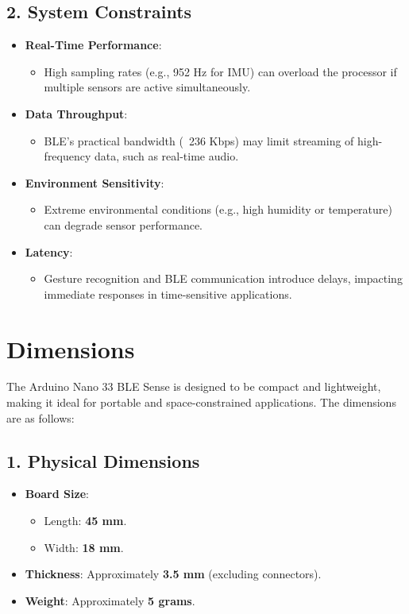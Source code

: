 	\subsection*{2. System Constraints}
	
	\begin{itemize}
		\item \textbf{Real-Time Performance}:
		\begin{itemize}
			\item High sampling rates (e.g., 952 Hz for IMU) can overload the processor if multiple sensors are active simultaneously.
		\end{itemize}
		\item \textbf{Data Throughput}:
		\begin{itemize}
			\item BLE's practical bandwidth (~236 Kbps) may limit streaming of high-frequency data, such as real-time audio.
		\end{itemize}
		\item \textbf{Environment Sensitivity}:
		\begin{itemize}
			\item Extreme environmental conditions (e.g., high humidity or temperature) can degrade sensor performance.
		\end{itemize}
		\item \textbf{Latency}:
		\begin{itemize}
			\item Gesture recognition and BLE communication introduce delays, impacting immediate responses in time-sensitive applications.
		\end{itemize}
	\end{itemize}

\section{Dimensions}
	The Arduino Nano 33 BLE Sense is designed to be compact and lightweight, making it ideal for portable and space-constrained applications. The dimensions are as follows:
	
	\subsection*{1. Physical Dimensions}
	\begin{itemize}
		\item \textbf{Board Size}: 
		\begin{itemize}
			\item Length: \textbf{45 mm}.
			\item Width: \textbf{18 mm}.
		\end{itemize}
		\item \textbf{Thickness}: Approximately \textbf{3.5 mm} (excluding connectors).
		\item \textbf{Weight}: Approximately \textbf{5 grams}.
	\end{itemize}
	

